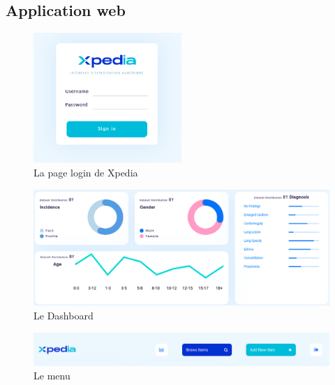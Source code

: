 \documentclass[12pt]{report}
\begin{document}
    \subsection{Application web}
    \begin{figure}[H]
        \centering
        \includegraphics[width=0.5\textwidth]{xpedia_log.png}
        \caption{La page login de Xpedia}\label{fig:xpedia_log}
    \end{figure}
    \begin{figure}[H]
        \centering
        \includegraphics[width=\textwidth]{xpedia_dashboard.png}
        \caption{Le Dashboard}\label{fig:xpedia_dashboard}
    \end{figure}
    \begin{figure}[H]
        \centering
        \includegraphics[width=1\textwidth]{xpedia_menu.png}
        \caption{Le menu}\label{fig:xpedia_menu}
    \end{figure}
\end{document}
